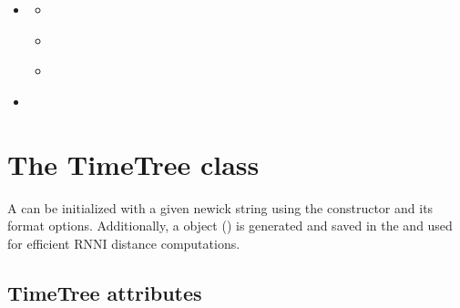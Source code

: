 \documentclass[letterpaper,10pt,english]{sphinxmanual}
\begin{document}
\begin{sphinxShadowBox}
\begin{itemize}
\begin{itemize}
\begin{itemize}
\end{itemize}

\item {} 
\sphinxAtStartPar
{}\label{\detokenize{trees:id11}}{\hyperref[\detokenize{trees:classes-for-the-c-library}]{}}
\begin{itemize}
\item {} 
\sphinxAtStartPar
{}\label{\detokenize{trees:id12}}{\hyperref[\detokenize{trees:node}]{}}

\item {} 
\sphinxAtStartPar
{}\label{\detokenize{trees:id13}}{\hyperref[\detokenize{trees:tree}]{}}

\item {} 
\sphinxAtStartPar
{}\label{\detokenize{trees:id14}}{\hyperref[\detokenize{trees:treelist}]{}}

\end{itemize}

\item {} 
\sphinxAtStartPar
{}\label{\detokenize{trees:id15}}{\hyperref[\detokenize{trees:class-converter-functions}]{}}

\end{itemize}

\end{itemize}
\end{sphinxShadowBox}


\section{The TimeTree class}
\label{\detokenize{trees:the-timetree-class}}
\sphinxAtStartPar
A  can be initialized with a given newick string using the  constructor and its format options.
Additionally, a  object ({\hyperref[\detokenize{trees:c-classes}]{}}) is generated and saved in the  and used for efficient RNNI distance computations.


\subsection{TimeTree attributes}
\label{\detokenize{trees:timetree-attributes}}
\end{document}
